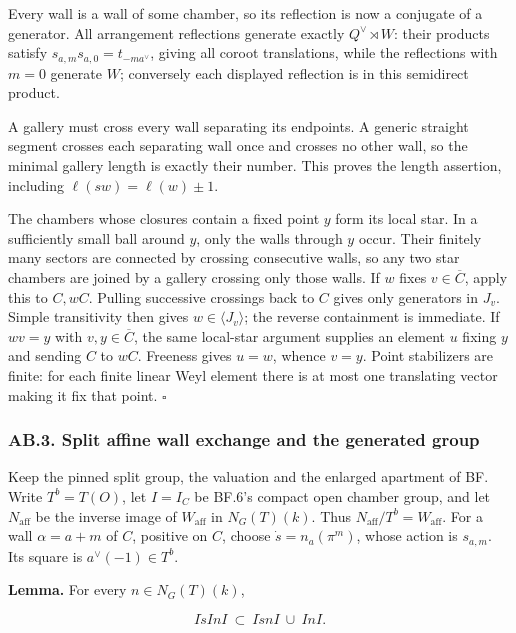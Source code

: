 \documentclass[
  11pt,
]{article}
\begin{document}
Every wall is a wall of some chamber, so its reflection is now a
conjugate of a generator. All arrangement reflections generate exactly
\(Q^\vee\rtimes W\): their products satisfy
\(s_{a,m}s_{a,0}=t_{-ma^\vee}\), giving all coroot translations, while
the reflections with \(m=0\) generate \(W\); conversely each displayed
reflection is in this semidirect product.

A gallery must cross every wall separating its endpoints. A generic
straight segment crosses each separating wall once and crosses no other
wall, so the minimal gallery length is exactly their number. This proves
the length assertion, including \(\ell(sw)=\ell(w)\pm1\).

The chambers whose closures contain a fixed point \(y\) form its local
star. In a sufficiently small ball around \(y\), only the walls through
\(y\) occur. Their finitely many sectors are connected by crossing
consecutive walls, so any two star chambers are joined by a gallery
crossing only those walls. If \(w\) fixes \(v\in\overline C\), apply
this to \(C,wC\). Pulling successive crossings back to \(C\) gives only
generators in \(J_v\). Simple transitivity then gives
\(w\in\langle J_v\rangle\); the reverse containment is immediate. If
\(wv=y\) with \(v,y\in\overline C\), the same local-star argument
supplies an element \(u\) fixing \(y\) and sending \(C\) to \(wC\).
Freeness gives \(u=w\), whence \(v=y\). Point stabilizers are finite:
for each finite linear Weyl element there is at most one translating
vector making it fix that point. \(\square\)

\subsubsection{AB.3. Split affine wall exchange and the generated
group}\label{ab.3.-split-affine-wall-exchange-and-the-generated-group}

Keep the pinned split group, the valuation and the enlarged apartment of
BF. Write \(T^b=T(O)\), let \(I=I_C\) be BF.6's compact open chamber
group, and let \(N_{\mathrm{aff}}\) be the inverse image of
\(W_{\mathrm{aff}}\) in \(N_G(T)(k)\). Thus
\(N_{\mathrm{aff}}/T^b=W_{\mathrm{aff}}\). For a wall \(\alpha=a+m\) of
\(C\), positive on \(C\), choose \(\dot s=n_a(\pi^m)\), whose action is
\(s_{a,m}\). Its square is \(a^\vee(-1)\in T^b\).

\textbf{Lemma.} For every \(n\in N_G(T)(k)\),

\[
 I\dot s I n I\ \subset\ I\dot s n I\ \cup\ I n I.
 \tag{AB.6}
\]
\end{document}
